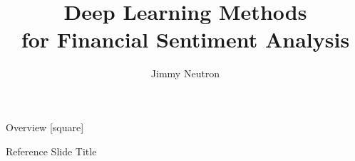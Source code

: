 \documentclass[xcolor=dvipsnames]{beamer}
\title[alt title]{Deep Learning Methods \\ for Financial Sentiment Analysis}
\date{}
\author[alt author]{Jimmy Neutron}
\institute[alt institution]{University of Narnia}
\begin{document}
\maketitle

\begin{frame}{Overview}
[square]
\tableofcontents
\end{frame}



\begin{frame}[allowframebreaks]{Reference Slide Title}
\printbibliography[title=Reference Slide Title]
\end{frame} 
\end{document}
